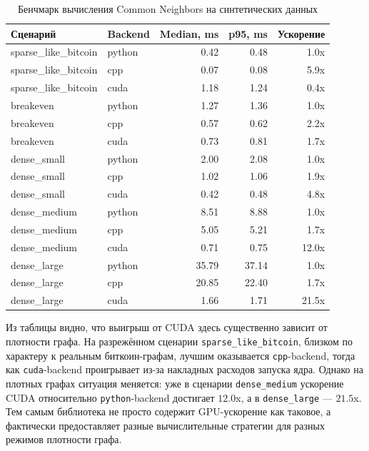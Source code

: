 \documentclass[a4paper,12pt]{extarticle}
\begin{document}
  \begin{table}[h]
  \centering
  \caption{Бенчмарк вычисления Common Neighbors на синтетических данных}
  \label{tab:cuda_cn_bench}
  \begin{tabular}{l l r r r}
  \toprule
  Сценарий & Backend & Median, ms & p95, ms & Ускорение \\
  \midrule
  sparse\_like\_bitcoin & python & 0.42 & 0.48 & 1.0x \\
  sparse\_like\_bitcoin & cpp    & 0.07 & 0.08 & 5.9x \\
  sparse\_like\_bitcoin & cuda   & 1.18 & 1.24 & 0.4x \\
  \midrule
  breakeven             & python & 1.27 & 1.36 & 1.0x \\
  breakeven             & cpp    & 0.57 & 0.62 & 2.2x \\
  breakeven             & cuda   & 0.73 & 0.81 & 1.7x \\
  \midrule
  dense\_small          & python & 2.00 & 2.08 & 1.0x \\
  dense\_small          & cpp    & 1.02 & 1.06 & 1.9x \\
  dense\_small          & cuda   & 0.42 & 0.48 & 4.8x \\
  \midrule
  dense\_medium         & python & 8.51 & 8.88 & 1.0x \\
  dense\_medium         & cpp    & 5.05 & 5.21 & 1.7x \\
  dense\_medium         & cuda   & 0.71 & 0.75 & 12.0x \\
  \midrule
  dense\_large          & python & 35.79 & 37.14 & 1.0x \\
  dense\_large          & cpp    & 20.85 & 22.40 & 1.7x \\
  dense\_large          & cuda   & 1.66 & 1.71 & 21.5x \\
  \bottomrule
  \end{tabular}
  \end{table}

  Из таблицы видно, что выигрыш от CUDA здесь существенно зависит от плотности графа. На разрежённом сценарии \texttt{sparse\_like\_bitcoin}, близком по характеру к
  реальным биткоин-графам, лучшим оказывается \texttt{cpp}-backend, тогда как \texttt{cuda}-backend проигрывает из-за накладных расходов запуска ядра. Однако на
  плотных графах ситуация меняется: уже в сценарии \texttt{dense\_medium} ускорение CUDA относительно \texttt{python}-backend достигает $12.0$x, а в
  \texttt{dense\_large} --- $21.5$x. Тем самым библиотека не просто содержит GPU-ускорение как таковое, а фактически предоставляет разные вычислительные стратегии
  для разных режимов плотности графа.
\end{document}

